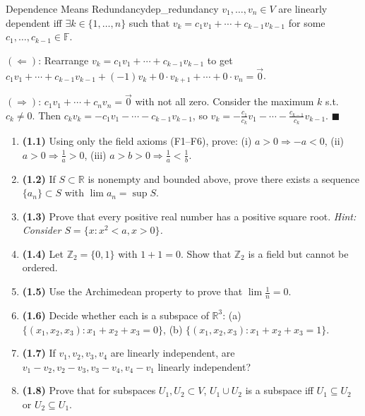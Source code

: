 \documentclass[11pt, letterpaper, openany]{book}
\renewenvironment{proof}[1][\proofname]{%
  \tcolorbox[blanker, breakable, left=1em,
    before skip=1em, after skip=1em,
    borderline west={2pt}{0pt}{MagicTeal!50},
    colback=MagicCream,
    before upper={\textcolor{MagicTeal}{\sffamily\bfseries #1.}\space}
  ]%
}{%
  \hfill\textcolor{MagicTeal}{\ensuremath{\blacksquare}}\endtcolorbox%
}
\newcounter{exercise}[chapter]
\begin{document}
\begin{lem}{Dependence Means Redundancy}{dep_redundancy}
$v_1, \ldots, v_n \in V$ are linearly dependent iff $\exists k \in \{1, \ldots, n\}$ such that $v_k = c_1 v_1 + \cdots + c_{k-1} v_{k-1}$ for some $c_1, \ldots, c_{k-1} \in \mathbb{F}$.
\end{lem}

\begin{proof}
$(\Leftarrow)$: Rearrange $v_k = c_1 v_1 + \cdots + c_{k-1} v_{k-1}$ to get $c_1 v_1 + \cdots + c_{k-1} v_{k-1} + (-1) v_k + 0 \cdot v_{k+1} + \cdots + 0 \cdot v_n = \vec{0}$.

$(\Rightarrow)$: $c_1 v_1 + \cdots + c_n v_n = \vec{0}$ with not all zero. Consider the maximum $k$ s.t. $c_k \neq 0$. Then $c_k v_k = -c_1 v_1 - \cdots - c_{k-1} v_{k-1}$, so $v_k = -\frac{c_1}{c_k} v_1 - \cdots - \frac{c_{k-1}}{c_k} v_{k-1}$.
\end{proof}

\begin{exercises}
\begin{enumerate}
    \item \textbf{(1.1)} Using only the field axioms (F1--F6), prove: (i) $a > 0 \Rightarrow -a < 0$, (ii) $a > 0 \Rightarrow \frac{1}{a} > 0$, (iii) $a > b > 0 \Rightarrow \frac{1}{a} < \frac{1}{b}$.
    
    \item \textbf{(1.2)} If $S \subset \mathbb{R}$ is nonempty and bounded above, prove there exists a sequence $\{a_n\} \subset S$ with $\lim a_n = \sup S$.
    
    \item \textbf{(1.3)} Prove that every positive real number has a positive square root. \textit{Hint: Consider $S = \{x : x^2 < a, x > 0\}$.}
    
    \item \textbf{(1.4)} Let $\mathbb{Z}_2 = \{0, 1\}$ with $1 + 1 = 0$. Show that $\mathbb{Z}_2$ is a field but cannot be ordered.
    
    \item \textbf{(1.5)} Use the Archimedean property to prove that $\lim \frac{1}{n} = 0$.
    
    \item \textbf{(1.6)} Decide whether each is a subspace of $\mathbb{R}^3$: (a) $\{(x_1,x_2,x_3) : x_1 + x_2 + x_3 = 0\}$, (b) $\{(x_1,x_2,x_3) : x_1 + x_2 + x_3 = 1\}$.
    
    \item \textbf{(1.7)} If $v_1, v_2, v_3, v_4$ are linearly independent, are $v_1 - v_2, v_2 - v_3, v_3 - v_4, v_4 - v_1$ linearly independent?
    
    \item \textbf{(1.8)} Prove that for subspaces $U_1, U_2 \subset V$, $U_1 \cup U_2$ is a subspace iff $U_1 \subseteq U_2$ or $U_2 \subseteq U_1$.
\end{enumerate}
\end{exercises}
\end{document}
